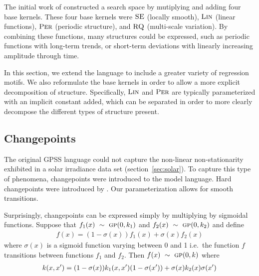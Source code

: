 \documentclass{article}
\def\ie{i.e.\ }
\begin{document}
The initial work of \cite{DuvLloGroetal13} constructed a search space by mutiplying and adding four base kernels.  These four base kernels were ${\textsc{SE}}$ (locally smooth), ${\textsc{Lin}}$ (linear functions), ${\textsc{Per}}$ (periodic structure), and ${\textsc{RQ}}$ (multi-scale variation).  By combining these functions, many structures could be expressed, such as periodic functions with long-term trends, or short-term deviations with linearly increasing amplitude through time.



In this section, we extend the language to include a greater variety of regression motifs.
We also reformulate the base kernels in order to allow a more explicit decomposition of structure.  Specifically, ${\textsc{Lin}}$ and ${\textsc{Per}}$ are typically parameterized with an implicit constant added, which can be separated in order to more clearly decompose the different types of structure present.


\subsection{Changepoints}

The original GPSS language could not capture the non-linear non-stationarity exhibited in a solar irradiance data set (section~\ref{sec:solar}).
To capture this type of phenomena, changepoints were introduced to the model language. Hard changepoints were introduced by \citep{garnett2010sequential, FoxDunson:NIPS2012}.  Our parameterization allows for smooth transitions.

Surprisingly, changepoints can be expressed simply by multiplying by sigmoidal functions.
Suppose that $f_1(x) \ \sim\  {\textsc{gp}}{}(0, k_1)$ and $f_2(x) \ \sim\  {\textsc{gp}}{}(0, k_2)$ and define
\begin{align}
f(x) = (1-\sigma(x))f_1(x) + \sigma(x)f_2(x)
\end{align}
where $\sigma(x)$ is a sigmoid function varying between 0 and 1 \ie the function $f$ transitions between functions $f_1$ and $f_2$.
Then $f(x) \ \sim\  {\textsc{gp}}{}(0,k)$ where
\begin{align}
\kernel(x,x') = (1-\sigma(x))k_1(x,x')(1-\sigma(x')) + \sigma(x)k_2(x)\sigma(x')
\label{eq:cp}
\end{align}
\end{document}
